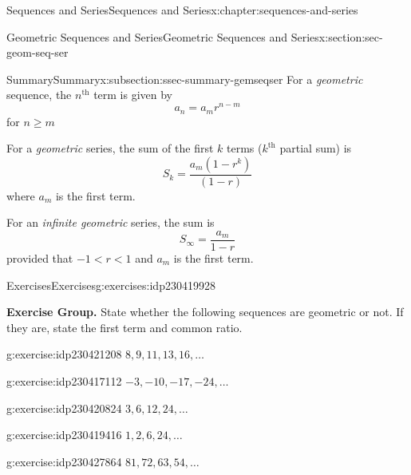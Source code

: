 \documentclass[twoside,10pt,]{book}
\numberwithin{equation}{section}
\newcommand{\nth}{{n^{\text{th}}}}
\newcommand{\kth}{{k^{\text{th}}}}
\newcommand{\lt}{<}
\begin{document}
\begin{chapterptx}{Sequences and Series}{}{Sequences and Series}{}{}{x:chapter:sequences-and-series}
\begin{sectionptx}{Geometric Sequences and Series}{}{Geometric Sequences and Series}{}{}{x:section:sec-geom-seq-ser}
\typeout{************************************************}
%
\begin{subsectionptx}{Summary}{}{Summary}{}{}{x:subsection:ssec-summary-gemseqser}
For a \emph{geometric} sequence, the \(\nth{}\) term is given by%
\begin{equation*}
{a_n} = {a_m}{r^{n - m}}
\end{equation*}
for \(n \ge m\)%
\par
For a \emph{geometric} series, the sum of the first \(k\) terms (\(\kth{}\) partial sum) is%
\begin{equation*}
{S_k} = \frac{{{a_m}\left( {1 - {r^k}} \right)}}{{\left( {1 - r} \right)}}
\end{equation*}
where \(a_m\) is the first term.%
\par
For an \emph{infinite geometric} series, the sum is%
\begin{equation*}
{S_\infty } = \frac{{{a_m}}}{{1 - r}}
\end{equation*}
provided that  \(-1 \lt r \lt 1\) and \(a_m\) is the first term.%
\end{subsectionptx}
%
%
\typeout{************************************************}
\typeout{************************************************}
%
\begin{exercises-subsection}{Exercises}{}{Exercises}{}{}{g:exercises:idp230419928}
\par\medskip\noindent%
\textbf{Exercise Group.}\space\space%
State whether the following sequences are geometric or not.  If they are, state the first term and common ratio.\begin{exercisegroup}
\begin{divisionexerciseeg}{1}{}{}{g:exercise:idp230421208}%
\(8, 9, 11, 13, 16, \ldots\)\end{divisionexerciseeg}%
\begin{divisionexerciseeg}{2}{}{}{g:exercise:idp230417112}%
\(-3, -10, -17, -24, \ldots\)\end{divisionexerciseeg}%
\begin{divisionexerciseeg}{3}{}{}{g:exercise:idp230420824}%
\(3, 6, 12, 24, \ldots\)\end{divisionexerciseeg}%
\begin{divisionexerciseeg}{4}{}{}{g:exercise:idp230419416}%
\(1, 2, 6, 24, \ldots\)\end{divisionexerciseeg}%
\begin{divisionexerciseeg}{5}{}{}{g:exercise:idp230427864}%
\(81, 72, 63, 54, \ldots\)\end{divisionexerciseeg}%

\end{exercisegroup}
\end{exercises-subsection}
\end{sectionptx}
\end{chapterptx}
\end{document}
